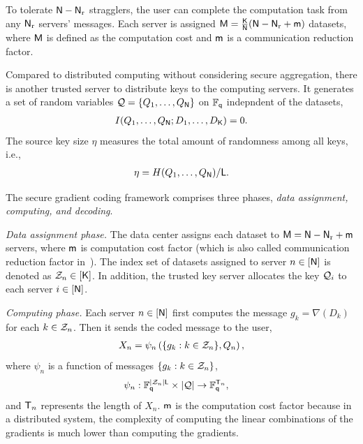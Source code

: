 \documentclass[conference,letterpaper]{IEEEtran}
\begin{document}
To tolerate ${\sf N} - {\sf N}_{\rm r}$ stragglers, the user can complete the computation task from any ${\sf N}_{\rm r}$ servers' messages. Each server is assigned ${\sf M} = \frac{{\sf K}}{{\sf N}} ({\sf N} - {\sf N}_{\rm r} + {\sf m} ) $ datasets, where ${\sf M}$ is defined as the computation cost and ${\sf m}$ is a communication reduction factor.

\fi
 Compared to distributed computing without considering secure aggregation, there is another trusted  server to distribute keys to the computing servers. It generates a set of  random variables ${\cal Q} = \{Q_{1}, \ldots, Q_{{\sf N}}\}$ on $\mathbb{F}_{{\sf q}}$ indepndent of the datasets, %
\begin{align}
I(Q_1, \ldots, Q_{{\sf N}} ; D_1, \ldots, D_{{\sf K}} ) = 0. \label{eq:independent key}
\end{align}
The source key size \( \eta \) measures the total amount of randomness among all keys, i.e.,
\begin{align}
\eta = H( Q_1, \ldots, Q_{{\sf N}} )/{\sf L}. \label{eq:def of eta}
\end{align}


The secure gradient coding framework comprises three phases, {\it data assignment, computing, and decoding}. 

{\it Data assignment phase.}
The data center assigns each dataset to ${\sf M} ={\sf N}-{\sf N}_{\rm r}+{\sf m}$ servers, where ${\sf m}$ is  computation cost factor (which is also called communication reduction factor in~\cite{ye2018communication}). The index set of datasets assigned to server $n \in [{\sf N}]$ is denoted as ${\cal Z}_n \in [{\sf K}]$.  In addition, the trusted key server allocates the key   ${\cal Q}_i$ to each server $i\in [{\sf N}]$.



{\it Computing phase.}
Each server $n \in[{\sf N}]$ first computes the message $g_k = \nabla (D_k)$ for each $k \in {\cal Z}_n$. Then it sends the coded message to the user, 
\begin{align}
 X_n = \psi_n \left( \{g_k:  k \in {\cal Z}_n\},  Q_n \right),
 \end{align}
  where  $\psi_n$  is a  function of messages $\{g_k: k\in {\cal Z}_n\}$, 
\begin{align} 
\psi_n &:  \mathbb{F}_{{\sf q}}^{ |{\cal Z}_n| {\sf L}} \times   | {\cal Q} |  \to \mathbb{F}_{{\sf q}}^{ {\sf T}_n },  
\label{eq: encoding function def}
\end{align}
and ${\sf T}_n$ represents the length of $ X_n $. %
${\sf m}$ is the computation cost factor because  in a distributed system, the complexity of computing the linear combinations of the gradients is much lower than computing the gradients. %
\end{document}
